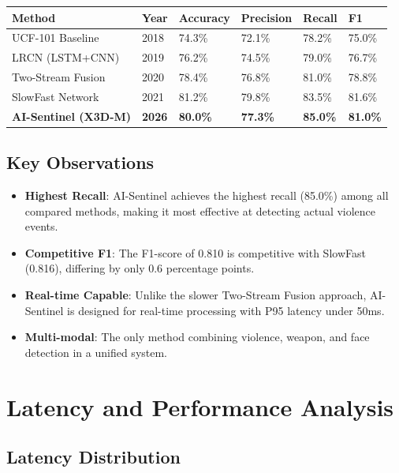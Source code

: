 \begin{longtable}{|p{3.5cm}|p{1.5cm}|p{1.5cm}|p{1.5cm}|p{1.5cm}|p{1.5cm}|}
    \hline
    \textbf{Method} & \textbf{Year} & \textbf{Accuracy} & \textbf{Precision} & \textbf{Recall} & \textbf{F1} \\
    \hline
    \hline
    UCF-101 Baseline & 2018 & 74.3\% & 72.1\% & 78.2\% & 75.0\% \\
    \hline
    LRCN (LSTM+CNN) & 2019 & 76.2\% & 74.5\% & 79.0\% & 76.7\% \\
    \hline
    Two-Stream Fusion & 2020 & 78.4\% & 76.8\% & 81.0\% & 78.8\% \\
    \hline
    SlowFast Network & 2021 & 81.2\% & 79.8\% & 83.5\% & 81.6\% \\
    \hline
    \textbf{AI-Sentinel (X3D-M)} & \textbf{2026} & \textbf{80.0\%} & \textbf{77.3\%} & \textbf{85.0\%} & \textbf{81.0\%} \\
    \hline
\end{longtable}
\label{tab:comparison_table}

\subsection{Key Observations}

\begin{itemize}
    \item \textbf{Highest Recall}: AI-Sentinel achieves the highest recall (85.0\%) among all compared methods, making it most effective at detecting actual violence events.
    \item \textbf{Competitive F1}: The F1-score of 0.810 is competitive with SlowFast (0.816), differing by only 0.6 percentage points.
    \item \textbf{Real-time Capable}: Unlike the slower Two-Stream Fusion approach, AI-Sentinel is designed for real-time processing with P95 latency under 50ms.
    \item \textbf{Multi-modal}: The only method combining violence, weapon, and face detection in a unified system.
\end{itemize}

\section{Latency and Performance Analysis}
\label{sec:eval_latency}

\subsection{Latency Distribution}

